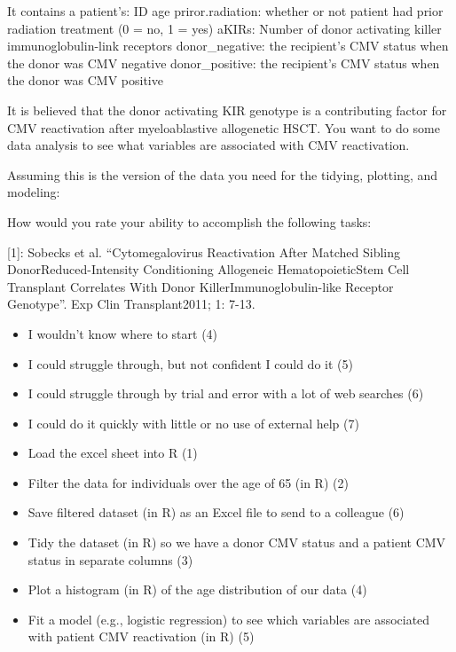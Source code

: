 \documentclass[030-workshop.tex]{subfiles}
\begin{document}
    It contains a patient's: ID age priror.radiation: whether or not patient had
    prior radiation treatment (0 = no, 1 = yes) aKIRs: Number of donor activating
    killer immunoglobulin-link receptors donor\_negative: the recipient's CMV status
    when the donor was CMV negative donor\_positive: the recipient's CMV status when
    the donor was CMV positive

    It is believed that the donor activating KIR genotype is a contributing factor
    for CMV reactivation after myeloablastive allogenetic HSCT. You want to do some
    data analysis to see what variables are associated with CMV reactivation.

    Assuming this is the version of the data you need for the tidying, plotting, and
    modeling:

    How would you rate your ability to accomplish the following tasks:

    [1]: Sobecks et al. “Cytomegalovirus Reactivation After Matched Sibling
    DonorReduced-Intensity Conditioning Allogeneic HematopoieticStem Cell Transplant
    Correlates With Donor KillerImmunoglobulin-like Receptor Genotype”. Exp Clin
    Transplant2011; 1: 7-13.

    \begin{itemize}
        \item I wouldn't know where to start (4)
        \item I could struggle through, but not confident I could do it (5)
        \item I could struggle through by trial and error with a lot of web searches (6)
        \item I could do it quickly with little or no use of external help (7)
    \end{itemize}

    \begin{itemize}
        \item Load the excel sheet into R (1)
        \item Filter the data for individuals over the age of 65 (in R) (2)
        \item Save filtered dataset (in R) as an Excel file to send to a colleague (6)
        \item Tidy the dataset (in R) so we have a donor CMV status and a patient CMV status in separate columns (3)
        \item Plot a histogram (in R) of the age distribution of our data (4)
        \item Fit a model (e.g., logistic regression) to see which variables are associated with patient CMV reactivation  (in R) (5)
    \end{itemize}
\end{document}
